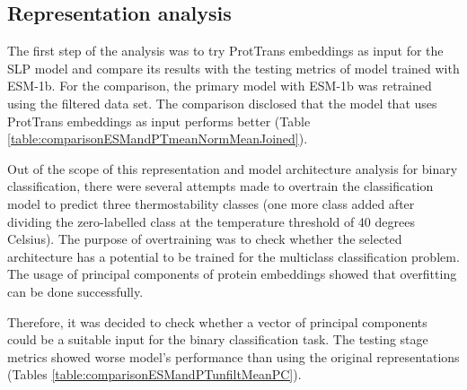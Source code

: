 \documentclass[12pt]{article}
\begin{document}
	\newpage

	\subsection{Representation analysis}

	The first step of the analysis was to try ProtTrans embeddings 
	as input for the SLP model and compare 
	its results with the testing metrics of model trained with 
	ESM-1b. For the comparison, the primary model with ESM-1b was 
	retrained using the filtered data set. The comparison disclosed 
	that the model that uses ProtTrans embeddings as input performs 
	better (Table \ref{table:comparisonESMandPTmeanNormMeanJoined}).

	Out of the scope of this representation and model architecture analysis
	for binary classification, there were several attempts made to overtrain
	the classification model to predict three thermostability classes (one 
	more class added after dividing the zero-labelled class at the temperature
	threshold of 40 degrees Celsius). The purpose of overtraining was to check 
	whether the selected architecture has a potential to be trained for the 
	multiclass classification problem. The usage of principal 
	components of protein embeddings showed that overfitting can be 
	done successfully.

	Therefore, it was decided to check whether 
	a vector of principal components could be a suitable input for the binary 
	classification task. The testing stage metrics showed worse model's performance 
	than using the original representations (Tables \ref{table:comparisonESMandPTunfiltMeanPC}). 
\end{document}
